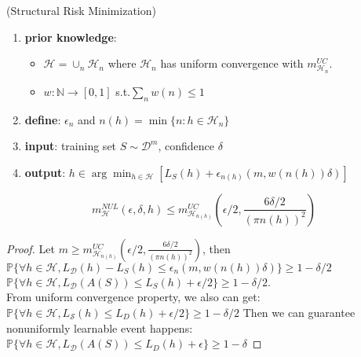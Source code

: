 \documentclass{beamer}
\begin{document}
\begin{frame}
    \begin{definition}
        (Structural Risk Minimization)
        \begin{enumerate}
            \item \textbf{prior knowledge}: 
                \begin{itemize}
                    \item $ \mathcal{H} = \cup_n \mathcal{H}_n $ where $ \mathcal{H}_n $ has uniform convergence with $ m^{UC}_{\mathcal{H}_n} $.
                    \item $ w: \mathbb{N}\rightarrow [0,1]$ s.t.$\sum^{}_{n} w(n) \le 1 $  
                \end{itemize}
            \item \textbf{define}:
                $ \epsilon_n $ and $ n(h) = \min \{ n: h\in \mathcal{H}_n \} $ 
            \item \textbf{input}:
                training set $ S \sim \mathcal{D}^m $, confidence $ \delta $ 
            \item \textbf{output}: $ h \in \arg\min_{h \in \mathcal{H}} [L_S(h) + \epsilon_{n(h)}(m, w(n(h)) \delta) ] $
        \end{enumerate}
    \end{definition} 
\end{frame}

\begin{frame}
    \begin{theorem}
        \[
             m^{NUL}_{\mathcal{H}}(\epsilon, \delta, h) 
            \le m^{UC}_{\mathcal{H}_{n(h)}}\left(\epsilon/2, \frac{6\delta/2}{{(\pi n(h))}^2} \right)
        \]
    \end{theorem}
    \begin{proof}
        Let $ m \ge m^{UC}_{\mathcal{H}_{n(h)}}\left(\epsilon/2, \frac{6\delta/2}{{(\pi n(h))}^2} \right)  $, then
        $\mathbb{P} \{ \forall h \in \mathcal{H}, L_\mathcal{D}(h) - L_S(h) \le \epsilon_n(m, w(n(h))\delta) \} \ge 1-\delta/2$
        $\mathbb{P} \{ \forall h \in \mathcal{H}, L_\mathcal{D}(A(S)) \le L_S(h) + \epsilon/2 \} \ge 1-\delta/2$.\\
        From uniform convergence property, we also can get:
        $\mathbb{P} \{ \forall h \in \mathcal{H}, L_\mathcal{S}(h) \le L_D(h) + \epsilon/2 \} \ge 1-\delta/2$
        Then we can guarantee nonuniformly learnable event happens:
        $\mathbb{P} \{ \forall h \in \mathcal{H}, L_\mathcal{D}(A(S)) \le L_D(h) + \epsilon \} \ge 1-\delta$
    \end{proof}
\end{frame}
\end{document}
